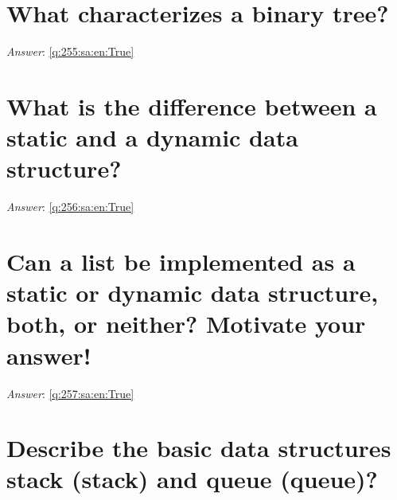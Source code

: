 \documentclass[a4paper,11pt,oneside]{book}
\begin{document}
\begin{sloppypar}
\section{What characterizes a binary tree?}

\label{q:255:sa:en:False}

\vspace{2cm}

\noindent\makebox[\textwidth]{\hrulefill}

\vspace{1cm}

\textit{Answer}: \autoref{q:255:sa:en:True}



\section{What is the difference between a static and a dynamic data structure?}

\label{q:256:sa:en:False}

\vspace{2cm}

\noindent\makebox[\textwidth]{\hrulefill}

\vspace{1cm}

\textit{Answer}: \autoref{q:256:sa:en:True}



\section{Can a list be implemented as a static or dynamic data structure, both, or neither? Motivate your answer!}

\label{q:257:sa:en:False}

\vspace{2cm}

\noindent\makebox[\textwidth]{\hrulefill}

\vspace{1cm}

\textit{Answer}: \autoref{q:257:sa:en:True}



\section{Describe the basic data structures stack (stack) and queue (queue)?}

\label{q:258:sa:en:False}

\vspace{2cm}


\end{sloppypar}
\end{document}

